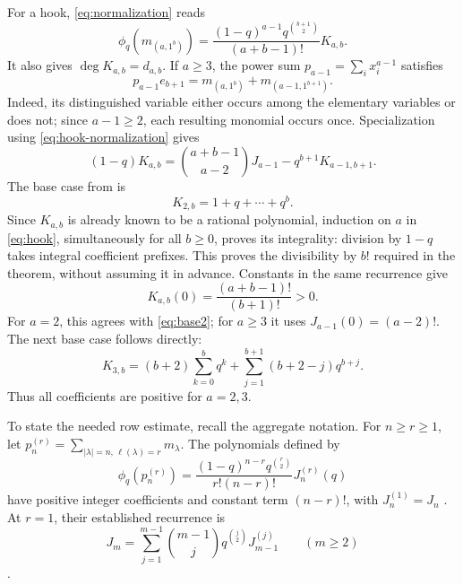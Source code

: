 \documentclass[11pt]{article}
\begin{document}
For a hook, \eqref{eq:normalization} reads
\begin{equation}\label{eq:hook-normalization}
 \phi_q(m_{(a,1^b)})=
 \frac{(1-q)^{a-1}q^{\binom{b+1}{2}}}{(a+b-1)!}K_{a,b}.
\end{equation}
It also gives $\deg K_{a,b}=d_{a,b}$. If $a\geq3$, the power sum
$p_{a-1}=\sum_i x_i^{a-1}$ satisfies
\[
 p_{a-1}e_{b+1}=m_{(a,1^b)}+m_{(a-1,1^{b+1})}.
\]
Indeed, its distinguished variable either occurs among the elementary
variables or does not; since $a-1\geq2$, each resulting monomial occurs
once. Specialization using \eqref{eq:hook-normalization} gives
\begin{equation}\label{eq:hook}
 (1-q)K_{a,b}=\binom{a+b-1}{a-2}J_{a-1}-q^{b+1}K_{a-1,b+1}.
\end{equation}
The base case from \cite[Equation~(3.22)]{BrugidouMonomial} is
\begin{equation}\label{eq:base2}
 K_{2,b}=1+q+\cdots+q^b.
\end{equation}
Since $K_{a,b}$ is already known to be a rational polynomial, induction on
$a$ in \eqref{eq:hook}, simultaneously for all $b\geq0$, proves its
integrality: division by $1-q$ takes integral coefficient prefixes.
This proves the divisibility by $b!$ required in the theorem, without
assuming it in advance. Constants in the same recurrence give
\begin{equation}\label{eq:constant}
 K_{a,b}(0)=\frac{(a+b-1)!}{(b+1)!}>0.
\end{equation}
For $a=2$, this agrees with \eqref{eq:base2}; for $a\geq3$ it uses
$J_{a-1}(0)=(a-2)!$. The next base case follows directly:
\begin{equation}\label{eq:base3}
 K_{3,b}=(b+2)\sum_{k=0}^{b}q^k
       +\sum_{j=1}^{b+1}(b+2-j)q^{b+j}.
\end{equation}
Thus all coefficients are positive for $a=2,3$.

To state the needed row estimate, recall the aggregate notation. For
$n\geq r\geq1$, let $p_n^{(r)}=\sum_{|\lambda|=n,\,\ell(\lambda)=r}m_\lambda$.
The polynomials defined by
\[
 \phi_q(p_n^{(r)})=
 \frac{(1-q)^{n-r}q^{\binom r2}}{r!(n-r)!}J_n^{(r)}(q)
\]
have positive integer coefficients and constant term $(n-r)!$, with
$J_n^{(1)}=J_n$ \cite[Theorem~6.3(i)]{BrugidouAnalog}.
At $r=1$, their established recurrence is
\begin{equation}\label{eq:row}
 J_m=\sum_{j=1}^{m-1}\binom{m-1}{j}q^{\binom j2}J_{m-1}^{(j)}
 \qquad(m\geq2)
\end{equation}
\cite[Equation~(6.5)]{BrugidouAnalog}.
\end{document}
